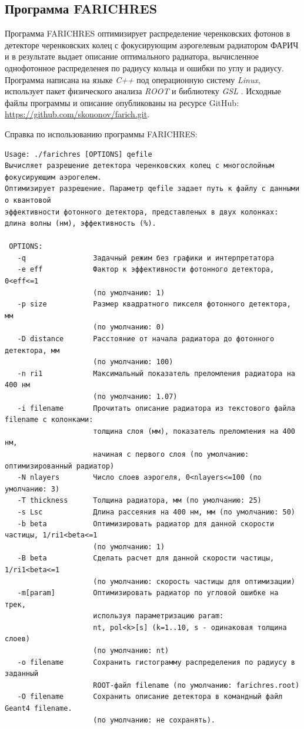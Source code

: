\documentclass[12pt]{article}
\begin{document}
\subsection{Программа FARICHRES}
Программа FARICHRES оптимизирует распределение черенковских фотонов в детекторе 
черенковских колец с фокусирующим аэрогелевым радиатором ФАРИЧ и в результате выдает описание оптимального радиатора,
вычисленное однофотонное распределенея по радиусу кольца и ошибки по углу и радиусу. 
Программа написана на языке {\em C++} под операционную систему {\em Linux}, использует пакет 
физического анализа {\em ROOT} \cite{root} и библиотеку {\em GSL} \cite{gsl}.
Исходные файлы программы и описание опубликованы на ресурсе GitHub:\\
\url{https://github.com/skononov/farich.git}.

Справка по использованию программы FARICHRES:
{\small
\begin{verbatim}
Usage: ./farichres [OPTIONS] qefile
Вычисляет разрешение детектора черенковских колец с многослойным фокусирующим аэрогелем.
Оптимизирует разрешение. Параметр qefile задает путь к файлу с данными о квантовой
эффективности фотонного детектора, представленых в двух колонках: 
длина волны (нм), эффективность (%).

 OPTIONS:
   -q                Задачный режим без графики и интерпретатора
   -e eff            Фактор к эффективности фотонного детектора, 0<eff<=1 
                     (по умолчанию: 1)
   -p size           Размер квадратного пикселя фотонного детектора, мм 
                     (по умолчанию: 0)
   -D distance       Расстояние от начала радиатора до фотонного детектора, мм 
                     (по умолчанию: 100)
   -n ri1            Максимальный показатель преломления радиатора на 400 нм 
                     (по умолчанию: 1.07)
   -i filename       Прочитать описание радиатора из текстового файла filename с колонками:
                     толщина слоя (мм), показатель преломления на 400 нм,
                     начиная с первого слоя (по умолчанию: оптимизированный радиатор)
   -N nlayers        Число слоев аэрогеля, 0<nlayers<=100 (по умолчанию: 3)
   -T thickness      Толщина радиатора, мм (по умолчанию: 25)
   -s Lsc            Длина рассеяния на 400 нм, мм (по умолчанию: 50)
   -b beta           Оптимизировать радиатор для данной скорости частицы, 1/ri1<beta<=1
                     (по умолчанию: 1)
   -B beta           Сделать расчет для данной скорости частицы, 1/ri1<beta<=1 
                     (по умолчанию: скорость частицы для оптимизации)
   -m[param]         Оптимизировать радиатор по угловой ошибке на трек, 
                     используя параметризацию param:
                     nt, pol<k>[s] (k=1..10, s - одинаковая толщина слоев) 
                     (по умолчанию: nt)
   -o filename       Сохранить гистограмму распределения по радиусу в заданный 
                     ROOT-файл filename (по умолчанию: farichres.root)
   -O filename       Сохранить описание детектора в командный файл Geant4 filename.
                     (по умолчанию: не cохранять).
\end{verbatim}
}
\end{document}
